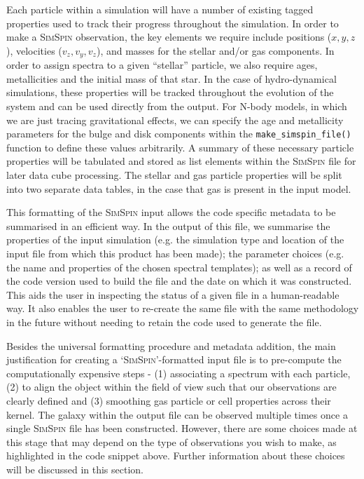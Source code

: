\documentclass[
  journal=pasa,
  manuscript=research-paper, %
  year=2020,
  volume=37,
]{cup-journal}
\newcommand{\simspin}[1]{\textsc{SimSpin}#1} %
\newcommand{\makesimspinfile}[1]{\texttt{make\_simspin\_file()}#1}
\begin{document}
Each particle within a simulation will have a number of existing tagged properties used to track their progress throughout the simulation. 
In order to make a \simspin{} observation, the key elements we require include positions ($x, y, z$), velocities ($v_z, v_y, v_z$), and masses for the stellar and/or gas components. 
In order to assign spectra to a given ``stellar'' particle, we also require ages, metallicities and the initial mass of that star. 
In the case of hydro-dynamical simulations, these properties will be tracked throughout the evolution of the system and can be used directly from the output.
For N-body models, in which we are just tracing gravitational effects, we can specify the age and metallicity parameters for the bulge and disk components within the \makesimspinfile{} function to define these values arbitrarily. 
A summary of these necessary particle properties will be tabulated and stored as list elements within the \simspin{} file for later data cube processing. 
The stellar and gas particle properties will be split into two separate data tables, in the case that gas is present in the input model. 

This formatting of the \simspin{} input allows the code specific metadata to be summarised in an efficient way. 
In the output of this file, we summarise the properties of the input simulation (e.g. the simulation type and location of the input file from which this product has been made); the parameter choices (e.g. the name and properties of the chosen spectral templates); as well as a record of the code version used to build the file and the date on which it was constructed. 
This aids the user in inspecting the status of a given file in a human-readable way.
It also enables the user to re-create the same file with the same methodology in the future without needing to retain the code used to generate the file. 

Besides the universal formatting procedure and metadata addition, the main justification for creating a `\simspin{}'-formatted input file is to pre-compute the computationally expensive steps - (1) associating a spectrum with each particle, (2) to align the object within the field of view such that our observations are clearly defined and (3) smoothing gas particle or cell properties across their kernel. 
The galaxy within the output file can be observed multiple times once a single \simspin{} file has been constructed. 
However, there are some choices made at this stage that may depend on the type of observations you wish to make, as highlighted in the code snippet above. 
Further information about these choices will be discussed in this section.
\end{document}
